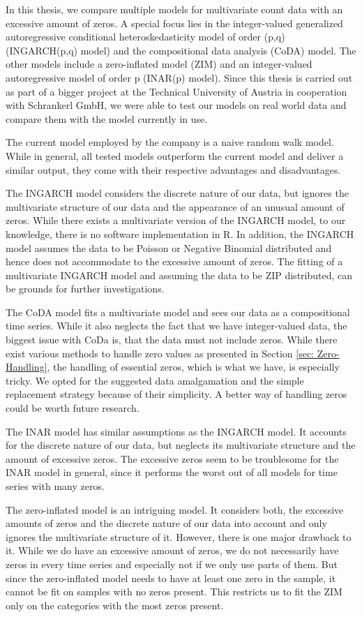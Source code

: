 In this thesis, we compare multiple models for multivariate count data with an excessive amount of zeros. A special focus lies in the integer-valued generalized autoregressive conditional heteroskedasticity model of order (p,q) (INGARCH(p,q) model) and the compositional data analysis (CoDA) model. The other models include a zero-inflated model (ZIM) and an integer-valued autoregressive model of order p (INAR(p) model). Since this thesis is carried out as part of a bigger project at the Technical University of Austria in cooperation with Schrankerl GmbH, we were able to test our models on real world data and compare them with the model currently in use. 

The current model employed by the company is a naive random walk model. While in general, all tested models outperform the current model and deliver a similar output, they come with their respective advantages and disadvantages.

The INGARCH model considers the discrete nature of our data, but ignores the multivariate structure of our data and the appearance of an unusual amount of zeros. While there exists a multivariate version of the INGARCH model, to our knowledge, there is no software implementation in R. In addition, the INGARCH model assumes the data to be Poisson or Negative Binomial distributed and hence does not accommodate to the excessive amount of zeros. The fitting of a multivariate INGARCH model and assuming the data to be ZIP distributed, can be grounds for further investigations. 

The CoDA model fits a multivariate model and sees our data as a compositional time series. While it also neglects the fact that we have integer-valued data, the biggest issue with CoDa is, that the data must not include zeros. While there exist various methods to handle zero values as presented in Section \ref{sec: Zero-Handling}, the handling of essential zeros, which is what we have, is especially tricky. We opted for the suggested data amalgamation and the simple replacement strategy because of their simplicity. A better way of handling zeros could be worth future research. 

The INAR model has similar assumptions as the INGARCH model. It accounts for the discrete nature of our data, but neglects its multivariate structure and the amount of excessive zeros. The excessive zeros seem to be troublesome for the INAR model in general, since it performs the worst out of all models for time series with many zeros. 

The zero-inflated model is an intriguing model. It considers both, the excessive amounts of zeros and the discrete nature of our data into account and only ignores the multivariate structure of it. However, there is one major drawback to it. While we do have an excessive amount of zeros, we do not necessarily have zeros in every time series and especially not if we only use parts of them. But since the zero-inflated model needs to have at least one zero in the sample, it cannot be fit on samples with no zeros present. This restricts us to fit the ZIM only on the categories with the most zeros present. 

